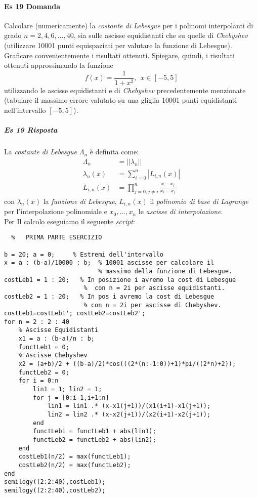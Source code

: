 \documentclass[a4paper]{report}
\begin{document}
\paragraph{Es 19 Domanda}
Calcolare (numericamente) la \emph{costante di Lebesgue} per i polinomi interpolanti di grado
$n = 2,4,6,...,40$, sia sulle ascisse equidistanti che su quelle di \emph{Chebyshev} (utilizzare 10001 punti equispaziati per valutare la funzione di Lebesgue).
Graficare convenientemente i risultati ottenuti.
Spiegare, quindi, i risultati ottenuti approssimando la funzione\\
\[
f(x)=\frac{1}{1+x^2},\ \  x \in [-5,5]
\]
utilizzando le ascisse equidistanti e di \emph{Chebyshev} precedentemente menzionate (tabulare il massimo errore valutato su una gliglia 10001 punti equidistanti nell'intervallo $[-5,5]$).
\subparagraph{Es 19 Risposta}
La \emph{costante di Lebesgue} $\Lambda_n$ è definita come:\\
\[
\begin{aligned}
\Lambda_n &= || \lambda_n||\\
\lambda_n(x) &= \sum_{i=0}^{n} |L_{i,n}(x)|\\
L_{i,n}(x) &= \prod_{j=0, j\neq i}^{n} \frac{x-x_j}{x_i-x_j}
\end{aligned}
\]
con $\lambda_n(x)$ la \emph{funzione di Lebesgue}, $L_{i,n}(x)$ il \emph{polinomio di base di Lagrange} per l'interpolazione polinomiale e $x_0,...,x_n$ le \emph{ascisse di interpolazione}.\\
Per Il calcolo eseguiamo il seguente \emph{script}:\\
\begin{lstlisting}	%	PRIMA PARTE ESERCIZIO

b = 20; a = 0;     % Estremi dell'intervallo
x = a : (b-a)/10000 : b;  % 10001 ascisse per calcolare il   
						  % massimo della funzione di Lebesgue.
costLeb1 = 1 : 20;   % In posizione i avremo la cost di Lebesgue
	                  %  con n = 2i per ascisse equidistanti.
costLeb2 = 1 : 20;   % In pos i avremo la cost di Lebesgue 
                      % con n = 2i per ascisse di Chebyshev.
costLeb1=costLeb1'; costLeb2=costLeb2';
for n = 2 : 2 : 40
	% Ascisse Equidistanti
	x1 = a : (b-a)/n : b;
	functLeb1 = 0;
	% Ascisse Chebyshev
	x2 = (a+b)/2 + ((b-a)/2)*cos(((2*(n:-1:0))+1)*pi/((2*n)+2));
	functLeb2 = 0;
	for i = 0:n
		lin1 = 1; lin2 = 1;
		for j = [0:i-1,i+1:n]
			lin1 = lin1 .* (x-x1(j+1))/(x1(i+1)-x1(j+1));
			lin2 = lin2 .* (x-x2(j+1))/(x2(i+1)-x2(j+1));
		end
		functLeb1 = functLeb1 + abs(lin1);
		functLeb2 = functLeb2 + abs(lin2); 
	end
	costLeb1(n/2) = max(functLeb1);
	costLeb2(n/2) = max(functLeb2);
end
semilogy((2:2:40),costLeb1);
semilogy((2:2:40),costLeb2);
\end{lstlisting}
\end{document}
